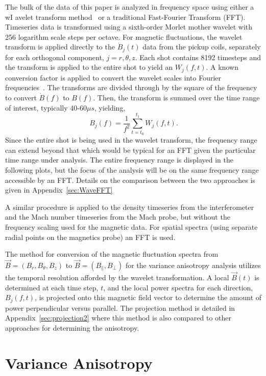 \documentclass[aip,prl,amsmath,amssymb,reprint,superscriptaddress]{revtex4-1} %
\begin{document}
The bulk of the data of this paper is analyzed in frequency space using either a wI avelet transform method~\cite{torrence98} or a traditional Fast-Fourier Transform (FFT). Timeseries data is transformed using a sixth-order Morlet mother wavelet with 256 logarithm scale steps per octave. For magnetic fluctuations, the wavelet transform is applied directly to the $\dot{B}_{j}(t)$ data from the pickup coils, separately for each orthogonal component, $j = r,\theta,z$. Each shot contains 8192 timesteps and the transform is applied to the entire shot to yield an $W_{j}(f,t)$. A known conversion factor is applied to convert the wavelet scales into Fourier frequencies~\cite{torrence98}. The transforms are divided through by the square of the frequency to convert $\dot{B}(f)$ to $B(f)$. Then, the transform is summed over the time range of interest, typically 40-60$\mu s$, yielding,
\begin{equation}
B_{j}(f) = \frac{1}{f^{2}}\sum_{t=t_{0}}^{t_{1}} W_{j}(f,t).
\label{eq:wavelet_transform}
\end{equation}
%
Since the entire shot is being used in the wavelet transform, the frequency range can extend beyond that which would be typical for an FFT given the particular time range under analysis. The entire frequency range is displayed in the following plots, but the focus of the analysis will be on the same frequency range accessible by an FFT. Details on the comparison between the two approaches is given in Appendix~\ref{sec:WaveFFT}

A similar procedure is applied to the density timeseries from the interferometer and the Mach number timeseries from the Mach probe, but without the frequency scaling used for the magnetic data. For spatial spectra (using separate radial points on the magnetics probe) an FFT is used.

The method for conversion of the magnetic fluctuation spectra from $\vec{B} = (B_{r},B_{\theta},B_{z})$ to $\vec{B} = (B_{\parallel},B_{\perp})$ for the variance anisotropy analysis utilizes the temporal resolution afforded by the wavelet transformation. A local $\vec{B}(t)$ is determined at each time step, $t$, and the local power spectra for each direction, $B_{j}(f,t)$, is projected onto this magnetic field vector to determine the amount of power perpendicular versus parallel. The projection method is detailed in Appendix~\ref{sec:projection2} where this method is also compared to other approaches for determining the anisotropy.

\section{Variance Anisotropy}\label{sec:variance}
\end{document}
